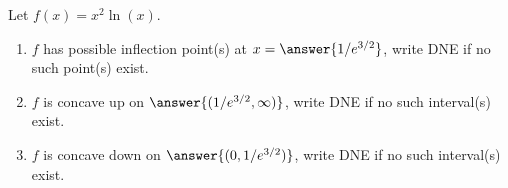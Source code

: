 \documentclass{ximera}
\author{Gregory Hartman \and Matthew Carr}
\begin{document}
\begin{exercise}






Let $f(x)=x^{2}\ln(x)$.
\begin{enumerate}
\item		$f$ has possible inflection point(s) at $x=\answer{1/e^{3/2}}$, write DNE if no such point(s) exist.
\item		$f$ is concave up on $\answer{(1/e^{3/2},\infty)}$, write DNE if no such interval(s) exist.
\item		$f$ is concave down on $\answer{(0,1/e^{3/2})}$, write DNE if no such interval(s) exist.
\end{enumerate}

\end{exercise}
\end{document}
